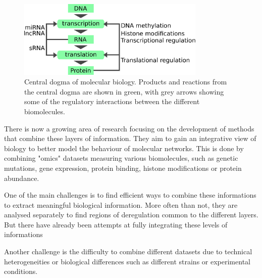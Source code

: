 \begin{figure}[htb]
    \includegraphics[width=0.8\textwidth]{Parts/Part01/gfx/central_dogma_regulation.pdf}
    \caption{Central dogma of molecular biology. Products and reactions from the central dogma are shown in green, with grey arrows showing some of the regulatory interactions between the different biomolecules.}
    \label{fig:01-02:central-dogma}
\end{figure}

There is now a growing area of research focusing on the development of methods that combine these layers of information. They aim to gain an integrative view of biology to better model the behaviour of molecular networks. This is done by combining "omics" datasets measuring various biomolecules, such as genetic mutations, gene expression, protein binding, histone modifications or protein abundance.

One of the main challenges is to find efficient ways to combine these informations to extract meaningful biological information. More often than not, they are analysed separately to find regions of deregulation common to the different layers. But there have already been attempts at fully integrating these levels of informations %

Another challenge is the difficulty to combine different datasets due to technical heterogeneities or biological differences such as different strains or experimental conditions.
